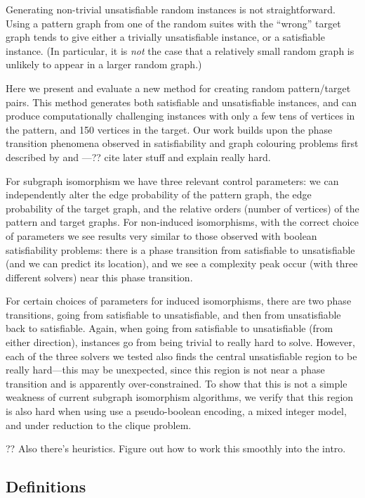 \documentclass[letterpaper]{article}
\begin{document}
Generating non-trivial unsatisfiable random instances is not straightforward. Using a
pattern graph from one of the random suites with the ``wrong'' target graph tends to give either a
trivially unsatisfiable instance, or a satisfiable instance. (In particular, it is \emph{not} the
case that a relatively small random graph is unlikely to appear in a larger random graph.)

Here we present and evaluate a new method for creating random pattern/target pairs. This method
generates both satisfiable and unsatisfiable instances, and can produce computationally challenging
instances with only a few tens of vertices in the pattern, and 150 vertices in the target. Our work
builds upon the phase transition phenomena observed in satisfiability and graph colouring problems
first described by \citet{Cheeseman:1991} and \citet{Mitchell:1992}---?? cite later stuff and
explain really hard.

For subgraph isomorphism we have three relevant control parameters: we can independently alter the
edge probability of the pattern graph, the edge probability of the target graph, and the relative
orders (number of vertices) of the pattern and target graphs.  For non-induced isomorphisms, with
the correct choice of parameters we see results very similar to those observed with boolean
satisfiability problems: there is a phase transition from satisfiable to unsatisfiable (and we can
predict its location), and we see a complexity peak occur (with three different solvers) near this
phase transition.

For certain choices of parameters for induced isomorphisms, there are two phase transitions, going
from satisfiable to unsatisfiable, and then from unsatisfiable back to satisfiable. Again, when
going from satisfiable to unsatisfiable (from either direction), instances go from being trivial to
really hard to solve. However, each of the three solvers we tested also finds the central
unsatisfiable region to be really hard---this may be unexpected, since this region is not near a
phase transition and is apparently over-constrained. To show that this is not a simple weakness of
current subgraph isomorphism algorithms, we verify that this region is also hard when using use a
pseudo-boolean encoding, a mixed integer model, and under reduction to the clique problem.

?? Also there's heuristics. Figure out how to work this smoothly into the intro.

\subsection{Definitions}
\end{document}
